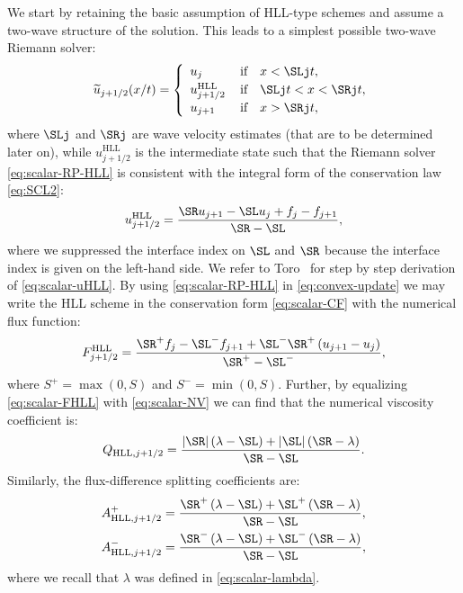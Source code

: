 We start by retaining the basic assumption of HLL-type schemes and assume a two-wave structure of the solution. This leads to a simplest possible two-wave Riemann solver:
\begin{equation} \label{eq:scalar-RP-HLL}
\widetilde{u}_{j+1/2}(x/t) = \left\{ \begin{array}{lll}
	u_j		 \quad \quad & \text{if} \quad x < \SLj t, \\[0.25em]
	u_{j+1/2}^\text{HLL} & \text{if} \quad \SLj t < x < \SRj t, \\[0.25em]
	u_{j+1}       		 & \text{if} \quad x > \SRj t,\end{array} \right.
\end{equation}
where $ \SLj $ and $ \SRj $ are wave velocity estimates (that are to be determined later on), while $ u_{j+1/2}^\text{HLL} $ is the intermediate state such that the Riemann solver \eqref{eq:scalar-RP-HLL} is consistent with the integral form of the conservation law \eqref{eq:SCL2}:
\begin{equation} \label{eq:scalar-uHLL}
u_{j+1/2}^{\text{HLL}} = \frac{\SR u_{j+1} - \SL u_j + f_j - f_{j+1}}{\SR - \SL},
\end{equation}
where we suppressed the interface index on $ \SL $ and $ \SR $ because the interface index is given on the left-hand side. We refer to Toro~\cite[p.~319]{tor09} for step by step derivation of \eqref{eq:scalar-uHLL}. By using \eqref{eq:scalar-RP-HLL} in \eqref{eq:convex-update} we may write the HLL scheme in the conservation form \eqref{eq:scalar-CF} with the numerical flux function:
\begin{equation} \label{eq:scalar-FHLL}
F_{j+1/2}^\text{HLL} = \frac{\SR^+ f_j - \SL^- f_{j+1} + \SL^- \SR^+ \left( u_{j+1} - u_{j} \right)}{\SR^+ - \SL^-},
\end{equation}
where $ S^+ = \max(0,S) $ and $ S^- = \min(0,S) $. Further, by equalizing \eqref{eq:scalar-FHLL} with \eqref{eq:scalar-NV} we can find that the numerical viscosity coefficient is:
\begin{equation} \label{eq:scalar-Q-HLL}
Q_{\text{HLL},j+1/2} = \frac{\left| \SR \right|\left( \lambda - \SL \right) + \left| \SL \right| \left( \SR - \lambda \right)}{\SR - \SL}.
\end{equation}
Similarly, the flux-difference splitting coefficients are:
\begin{subequations} \label{eq:scalar-A-HLL}
\begin{align}
A_{\text{HLL},j+1/2}^+ & = \frac{\SR^+ \left( \lambda - \SL \right) + \SL^+ \left( \SR - \lambda \right)}{\SR - \SL}, \\
A_{\text{HLL},j+1/2}^- & = \frac{\SR^- \left( \lambda - \SL \right) + \SL^- \left( \SR - \lambda \right)}{\SR - \SL},
\end{align}
\end{subequations}
where we recall that $ \lambda $ was defined in \eqref{eq:scalar-lambda}. 

